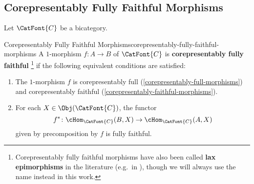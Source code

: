 \subsection{Corepresentably Fully Faithful Morphisms}\label{subsection-corepresentably-fully-faithful-morphisms}
Let $\CatFont{C}$ be a bicategory.
\begin{definition}{Corepresentably Fully Faithful Morphisms}{corepresentably-fully-faithful-morphisms}%
    A $1$-morphism $f\colon A\to B$ of $\CatFont{C}$ is \textbf{corepresentably fully faithful}%
    \footnote{%
        Corepresentably fully faithful morphisms have also been called \textbf{lax epimorphisms} in the literature (e.g.\ in \cite{on-functors-which-are-lax-epimorphisms}), though we will always use the name  instead in this work.
        \par\vspace*{\TCBBoxCorrection}
    } %
    if the following equivalent conditions are satisfied:
    \begin{enumerate}
        \item\label{corepresentably-fully-faithful-morphisms-1}The $1$-morphism $f$ is corepresentably full (\cref{corepresentably-full-morphisms}) and corepresentably faithful (\cref{corepresentably-faithful-morphisms}).
        \item\label{corepresentably-fully-faithful-morphisms-2}For each $X\in\Obj(\CatFont{C})$, the functor
            \[
                f^{*}%
                \colon%
                \cHom_{\CatFont{C}}(B,X)%
                \to%
                \cHom_{\CatFont{C}}(A,X)%
            \]%
            given by precomposition by $f$ is fully faithful.
    \end{enumerate}
\end{definition}
